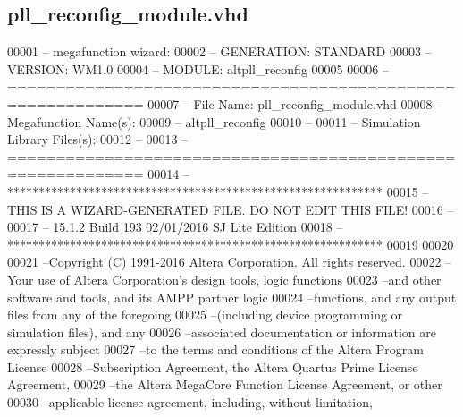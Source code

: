 \subsection{pll\+\_\+reconfig\+\_\+module.\+vhd}
\label{pll__reconfig__module_8vhd_source}

\begin{DoxyCode}
00001 \textcolor{keyword}{-- megafunction wizard: %
00002 \textcolor{keyword}{-- GENERATION: STANDARD}
00003 \textcolor{keyword}{-- VERSION: WM1.0}
00004 \textcolor{keyword}{-- MODULE: altpll\_reconfig }
00005 
00006 \textcolor{keyword}{-- ============================================================}
00007 \textcolor{keyword}{-- File Name: pll\_reconfig\_module.vhd}
00008 \textcolor{keyword}{-- Megafunction Name(s):}
00009 \textcolor{keyword}{--          altpll\_reconfig}
00010 \textcolor{keyword}{--}
00011 \textcolor{keyword}{-- Simulation Library Files(s):}
00012 \textcolor{keyword}{--          }
00013 \textcolor{keyword}{-- ============================================================}
00014 \textcolor{keyword}{-- ************************************************************}
00015 \textcolor{keyword}{-- THIS IS A WIZARD-GENERATED FILE. DO NOT EDIT THIS FILE!}
00016 \textcolor{keyword}{--}
00017 \textcolor{keyword}{-- 15.1.2 Build 193 02/01/2016 SJ Lite Edition}
00018 \textcolor{keyword}{-- ************************************************************}
00019 
00020 
00021 \textcolor{keyword}{--Copyright (C) 1991-2016 Altera Corporation. All rights reserved.}
00022 \textcolor{keyword}{--Your use of Altera Corporation's design tools, logic functions }
00023 \textcolor{keyword}{--and other software and tools, and its AMPP partner logic }
00024 \textcolor{keyword}{--functions, and any output files from any of the foregoing }
00025 \textcolor{keyword}{--(including device programming or simulation files), and any }
00026 \textcolor{keyword}{--associated documentation or information are expressly subject }
00027 \textcolor{keyword}{--to the terms and conditions of the Altera Program License }
00028 \textcolor{keyword}{--Subscription Agreement, the Altera Quartus Prime License Agreement,}
00029 \textcolor{keyword}{--the Altera MegaCore Function License Agreement, or other }
00030 \textcolor{keyword}{--applicable license agreement, including, without limitation, }
}
\end{DoxyCode}
